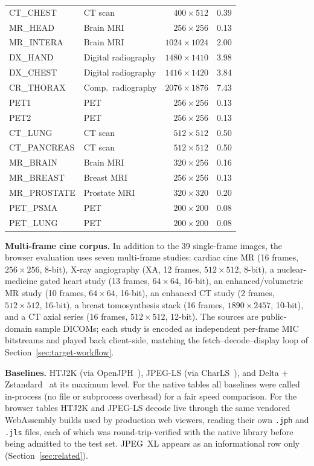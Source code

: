\documentclass[journal]{IEEEtran}
\begin{document}
\begin{table}[htbp]
\begin{tabular}{llrr}
CT\_CHEST    & CT scan             & $400{\times}512$   & 0.39 \\
MR\_HEAD     & Brain MRI           & $256{\times}256$   & 0.13 \\
MR\_INTERA   & Brain MRI           & $1024{\times}1024$ & 2.00 \\
DX\_HAND     & Digital radiography & $1480{\times}1410$ & 3.98 \\
DX\_CHEST    & Digital radiography & $1416{\times}1420$ & 3.84 \\
CR\_THORAX   & Comp.\ radiography  & $2076{\times}1876$ & 7.43 \\
PET1         & PET                 & $256{\times}256$   & 0.13 \\
PET2         & PET                 & $256{\times}256$   & 0.13 \\
CT\_LUNG     & CT scan             & $512{\times}512$   & 0.50 \\
CT\_PANCREAS & CT scan             & $512{\times}512$   & 0.50 \\
MR\_BRAIN    & Brain MRI           & $320{\times}256$   & 0.16 \\
MR\_BREAST   & Breast MRI          & $256{\times}256$   & 0.13 \\
MR\_PROSTATE & Prostate MRI        & $320{\times}320$   & 0.20 \\
PET\_PSMA    & PET                 & $200{\times}200$   & 0.08 \\
PET\_LUNG    & PET                 & $200{\times}200$   & 0.08 \\
\bottomrule
\end{tabular}
\end{table}

\textbf{Multi-frame cine corpus.} In addition to the 39 single-frame images,
the browser evaluation uses seven multi-frame studies: cardiac cine MR (16
frames, $256{\times}256$, 8-bit), X-ray angiography (XA, 12 frames,
$512{\times}512$, 8-bit), a nuclear-medicine gated heart study (13 frames,
$64{\times}64$, 16-bit), an enhanced/volumetric MR study (10 frames,
$64{\times}64$, 16-bit), an enhanced CT study (2 frames, $512{\times}512$,
16-bit), a breast tomosynthesis stack (16 frames, $1890{\times}2457$,
10-bit), and a CT axial series (16 frames, $512{\times}512$, 12-bit). The
sources are public-domain sample DICOMs; each study is encoded as
independent per-frame MIC bitstreams and played back client-side, matching
the fetch--decode--display loop of Section~\ref{sec:target-workflow}.

\textbf{Baselines.} HTJ2K (via OpenJPH~\cite{openjph}), JPEG-LS (via
CharLS~\cite{charls}), and Delta + Zstandard~\cite{rfc8878} at its maximum
level. For the native tables all baselines were called in-process (no file or
subprocess overhead) for a fair speed comparison. For the browser tables
HTJ2K and JPEG-LS decode live through the same vendored WebAssembly builds
used by production web viewers, reading their own \texttt{.jph} and
\texttt{.jls} files, each of which was round-trip-verified with the native
library before being admitted to the test set. JPEG~XL appears as an
informational row only (Section~\ref{sec:related}).
\end{document}
